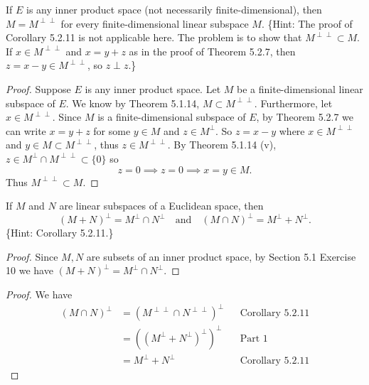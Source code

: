 \begin{tcolorbox}[title=Problem 4, breakable]
If $E$ is any inner product space (not necessarily finite-dimensional), then $M = M^{\perp\perp}$ for every finite-dimensional linear subspace $M$. \{Hint: The proof of Corollary 5.2.11 is not applicable here. The problem is to show that $M^{\perp\perp} \subset M$. If $x \in M^{\perp\perp}$ and $x = y + z$ as in the proof of Theorem 5.2.7, then $z = x - y \in M^{\perp\perp}$, so $z \perp z$.\}
\end{tcolorbox}

\begin{proof}
    Suppose $E$ is any inner product space. Let $M$ be a finite-dimensional linear subspace of $E$.
    We know by Theorem 5.1.14, $M \subset M^{\perp \perp}$.
    Furthermore, let $x \in M^{\perp \perp}$.
    Since $M$ is a finite-dimensional subspace of $E$, by Theorem 5.2.7 we can write $x = y + z$
        for some $y \in M$ and $z \in M^{\perp}$.
    So $z = x - y$ where $x \in M^{\perp \perp}$ and $y \in M \subset M^{\perp\perp}$,
        thus $z \in M^{\perp\perp}$.
    By Theorem 5.1.14 (v), $z \in M^{\perp} \cap M^{\perp\perp} \subset \{0\}$ so 
    \[z = 0 \implies z = 0 \implies x = y \in M.\]
    Thus $M^{\perp\perp} \subset M$.
\end{proof}

\begin{tcolorbox}[title=Problem 6, breakable]
If $M$ and $N$ are linear subspaces of a Euclidean space, then
\[
    (M + N)^\perp = M^\perp \cap N^\perp \quad \text{and} \quad (M \cap N)^\perp = M^\perp + N^\perp.
\]
\{Hint: Corollary 5.2.11.\}
\end{tcolorbox}

\begin{proof}
    Since $M, N$ are subsets of an inner product space,
    by Section 5.1 Exercise 10 we have $(M + N)^\perp = M^\perp \cap N^\perp$.
\end{proof}
\begin{proof}
    We have 
    \begin{align*}
    (M \cap N)^\perp &= (M^{\perp \perp} \cap N^{\perp \perp})^\perp && \text{Corollary 5.2.11} \\
                     &= ((M^\perp + N^\perp)^\perp)^\perp && \text{Part 1} \\
                     &= M^\perp + N^\perp && \text{Corollary 5.2.11}
    \end{align*}
\end{proof}



